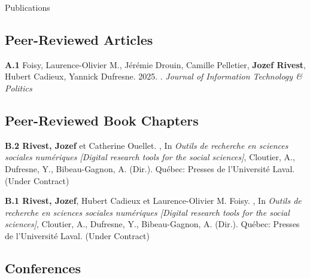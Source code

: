 \documentclass{resume} %
\begin{document}
\begin{rSection}{Publications}

\subsection*{Peer-Reviewed Articles}

\textbf{A.1} Foisy, Laurence-Olivier M., Jérémie Drouin, Camille Pelletier, \textbf{Jozef Rivest}, Hubert Cadieux, Yannick Dufresne. 2025. . \textit{Journal of Information Technology \& Politics} 

\subsection*{Peer-Reviewed Book Chapters}

{\textbf{B.2 Rivest, Jozef} et Catherine Ouellet. , In \textit{Outils de recherche en sciences sociales numériques [Digital research tools for the social sciences]}, Cloutier, A., Dufresne, Y., Bibeau-Gagnon, A. (Dir.). Québec: Presses de l'Université Laval. (Under Contract)} \par

{\textbf{B.1 Rivest, Jozef}, Hubert Cadieux et Laurence-Olivier M. Foisy. , In \textit{Outils de recherche en sciences sociales numériques [Digital research tools for the social sciences]}, Cloutier, A., Dufresne, Y., Bibeau-Gagnon, A. (Dir.). Québec: Presses de l'Université Laval.} (Under Contract) \par

\subsection*{Conferences}



\end{rSection}
\end{document}
